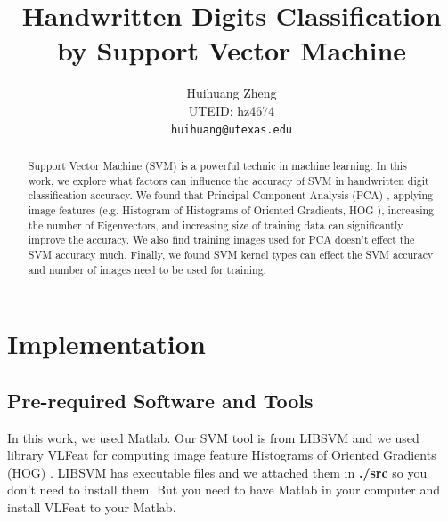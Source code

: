 \documentclass[10pt,twocolumn,letterpaper]{article}
\begin{document}
\title{Handwritten Digits Classification by Support Vector Machine}

\author{Huihuang Zheng\\
UTEID: hz4674\\
{\tt\small huihuang@utexas.edu}
}

\maketitle


\begin{abstract}
  Support Vector Machine (SVM) \cite{cortes1995support} is a powerful technic in machine learning. In this work, we explore what factors can influence the accuracy of SVM in handwritten digit classification accuracy. We found that Principal Component Analysis (PCA) \cite{jolliffe2002principal}, applying image features (e.g. Histogram of Histograms of Oriented Gradients, HOG \cite{dalal2005histograms}), increasing the number of Eigenvectors, and increasing size of training data can significantly improve the accuracy. We also find training images used for PCA doesn't effect the SVM accuracy much. Finally, we found SVM kernel types can effect the SVM accuracy and number of images need to be used for training.
\end{abstract}

\section{Implementation}
\subsection{Pre-required Software and Tools}
In this work, we used Matlab. Our SVM tool is from LIBSVM \cite{CC01a} and we used library VLFeat \cite{vedaldi08vlfeat} for computing image feature Histograms of Oriented Gradients (HOG) \cite{dalal2005histograms}. LIBSVM has executable files and we attached them in \textbf{./src} so you don't need to install them. But you need to have Matlab in your computer and install VLFeat to your Matlab.
\end{document}
